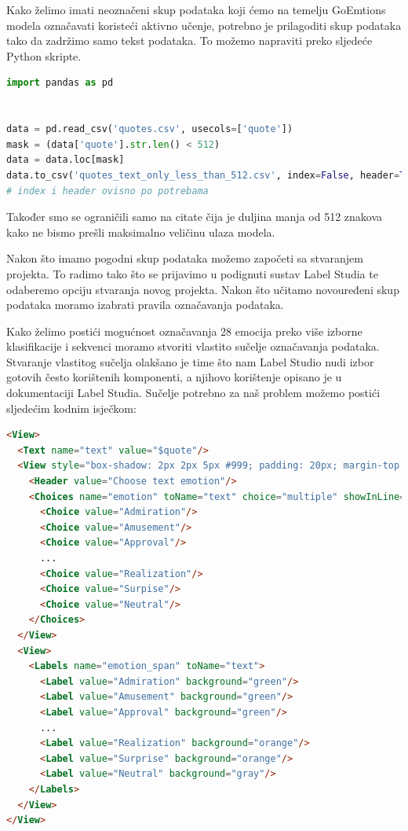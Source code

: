 \documentclass[times, utf8, zavrsni, numeric]{fer}
\begin{document}
Kako želimo imati neoznačeni skup podataka koji ćemo na temelju GoEmtions modela označavati koristeći aktivno učenje, potrebno je prilagoditi skup podataka tako da zadržimo samo tekst podataka.
To možemo napraviti preko sljedeće Python skripte.

\begin{lstlisting}[language=Python]
import pandas as pd


data = pd.read_csv('quotes.csv', usecols=['quote'])
mask = (data['quote'].str.len() < 512)
data = data.loc[mask]
data.to_csv('quotes_text_only_less_than_512.csv', index=False, header=True, encoding='utf8')
# index i header ovisno po potrebama
\end{lstlisting}

Također smo se ograničili samo na citate čija je duljina manja od 512 znakova kako ne bismo prešli maksimalno veličinu ulaza modela.

Nakon što imamo pogodni skup podataka možemo započeti sa stvaranjem projekta.
To radimo tako što se prijavimo u podignuti sustav Label Studia te odaberemo opciju stvaranja novog projekta. Nakon što učitamo novouređeni skup podataka moramo izabrati pravila označavanja podataka.

Kako želimo postići mogućnost označavanja 28 emocija preko više izborne klasifikacije i sekvenci moramo stvoriti vlastito sučelje označavanja podataka. Stvaranje vlastitog sučelja olakšano je time što nam Label Studio nudi izbor gotovih često korištenih komponenti, a njihovo korištenje opisano je u dokumentaciji Label Studia. Sučelje potrebno za naš problem možemo postići sljedećim kodnim isječkom:

\begin{minipage}{\linewidth}
\begin{lstlisting}[language=html]
<View>
  <Text name="text" value="$quote"/>
  <View style="box-shadow: 2px 2px 5px #999; padding: 20px; margin-top: 2em; border-radius: 5px;">
    <Header value="Choose text emotion"/>
    <Choices name="emotion" toName="text" choice="multiple" showInLine="true">
      <Choice value="Admiration"/>
      <Choice value="Amusement"/>
      <Choice value="Approval"/>
      ...
      <Choice value="Realization"/>
      <Choice value="Surpise"/>
      <Choice value="Neutral"/>
    </Choices>
  </View>
  <View>
    <Labels name="emotion_span" toName="text">
      <Label value="Admiration" background="green"/>
      <Label value="Amusement" background="green"/>
      <Label value="Approval" background="green"/>
      ...
      <Label value="Realization" background="orange"/>
      <Label value="Surprise" background="orange"/>
      <Label value="Neutral" background="gray"/>
    </Labels>
  </View>
</View>
\end{lstlisting}
\end{minipage}
\end{document}
